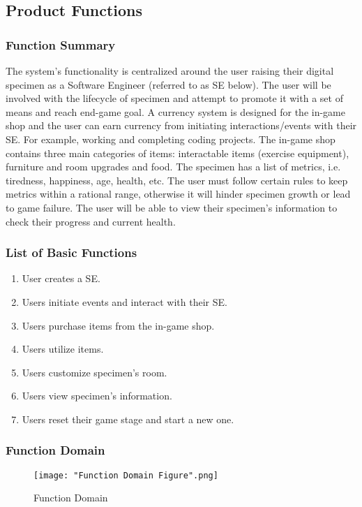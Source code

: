 \documentclass[]{article}
\begin{document}
\subsection{Product Functions}
\label{sub:product_functions}
\subsubsection{Function Summary}
The system’s functionality is centralized around the user raising their digital 
specimen as a Software Engineer (referred to as SE below). The user will be 
involved with the lifecycle of specimen and attempt to promote it with a set 
of means and reach end-game goal. A currency system is designed for the in-game 
shop and the user can earn currency from initiating interactions/events with 
their SE. For example, working and completing coding projects. The in-game 
shop contains three main categories of items: interactable items (exercise 
equipment), furniture and room upgrades and food. The specimen has a list of 
metrics, i.e. tiredness, happiness, age, health, etc. The user must follow 
certain rules to keep metrics within a rational range, otherwise it will 
hinder specimen growth or lead to game failure. The user will be able to view 
their specimen’s information to check their progress and current health. 

\subsubsection{List of Basic Functions}
\begin{enumerate}
    \item User creates a SE.
    \item Users initiate events and interact with their SE.
    \item Users purchase items from the in-game shop.
    \item Users utilize items.
    \item Users customize specimen’s room.
    \item Users view specimen’s information.
    \item Users reset their game stage and start a new one.
\end{enumerate}

\subsubsection{Function Domain}
\begin{figure}[H]
    \centering
    \texttt{[image: "Function Domain Figure".png]}
    \caption{Function Domain}
\end{figure}
\end{document}

